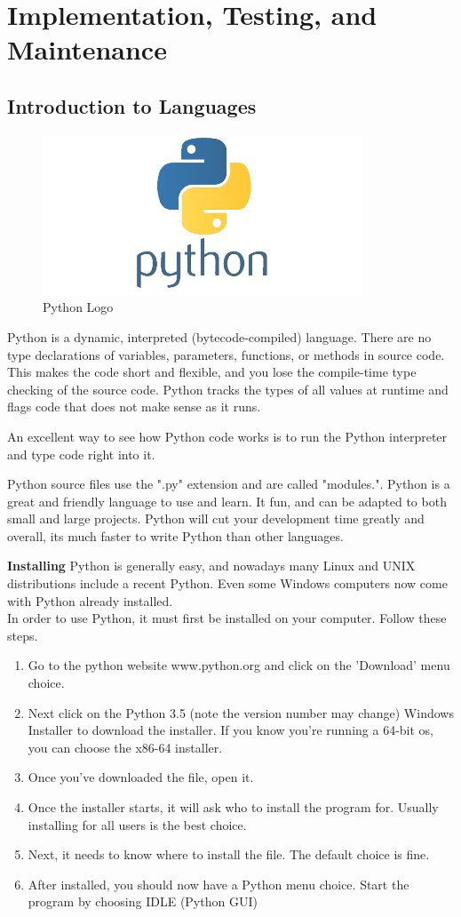 \chapter{Implementation, Testing, and Maintenance}
\section{Introduction to Languages}
\begin{figure}[h]
	\centering\includegraphics[scale=0.8]{images/python_logo.png}
	\caption{Python Logo}
\end{figure}
Python is a dynamic, interpreted (bytecode-compiled) language. There are no type declarations of variables, parameters, functions, or methods in source code. This makes the code short and flexible, and you lose the compile-time type checking of the source code. Python tracks the types of all values at runtime and flags code that does not make sense as it runs.

An excellent way to see how Python code works is to run the Python interpreter and type code right into it.

Python source files use the ".py" extension and are called "modules.". Python is a great and friendly language to use and learn. It fun, and can be adapted to both small and large projects. Python will cut your development time greatly and overall, its much faster to write Python than other languages.

\textbf{Installing} Python is generally easy, and nowadays many Linux and UNIX distributions include a recent Python. Even some Windows computers now come with Python already installed.\\
In order to use Python, it must first be installed on your computer. Follow these steps.
\begin{enumerate}
	\item Go to the python website www.python.org and click on the 'Download' menu choice.
	\item Next click on the Python 3.5 (note the version number may change) Windows Installer to download the installer. If you know you're running a 64-bit os, you can choose the x86-64 installer.
	\item Once you've downloaded the file, open it.
	\item Once the installer starts, it will ask who to install the program for. Usually installing for all users is the best choice.
	\item Next, it needs to know where to install the file. The default choice is fine.
	\item After installed, you should now have a Python menu choice. Start the program by choosing IDLE (Python GUI)
\end{enumerate}

